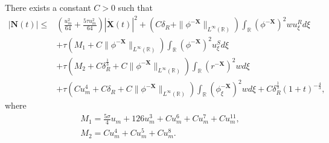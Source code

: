\documentclass[10pt,a4paper]{amsart}
\begin{document}
	\begin{lemma}\label{lem6}
		There exists a constant $C>0$ such that
		\begin{align*}
			\left|\mathbf{N}(t)\right|\leq&\left(\frac{u_m^2}{64}+\frac{5\tau u_m^2}{64}\right)|\dot{\mathbf{X}}(t)|^2+\left(C\delta_R+\|\phi^{-\mathbf{X}}\|_{L^{\infty}(\mathbb{R})}\right)\int_{\mathbb{R}}(\phi^{-\mathbf{X}})^2wu_{\xi}^Rd\xi\\
			&+\tau\left(M_1+C\|\phi^{-\mathbf{X}}\|_{L^{\infty}(\mathbb{R})}\right)\int_{\mathbb{R}}(\phi^{-\mathbf{X}})^2u_{\xi}^Sd\xi\\
			&+\tau\left(M_2+C\delta_R^{\frac{1}{3}}+C\|\phi^{-\mathbf{X}}\|_{L^{\infty}(\mathbb{R})}\right)\int_{\mathbb{R}}(r^{-\mathbf{X}})^2wd\xi\\
			&+\tau\left(Cu_m^4+C\delta_R+C\|\phi^{-\mathbf{X}}\|_{L^{\infty}(\mathbb{R})}\right)\int_{\mathbb{R}}(\phi_{\xi}^{-\mathbf{X}})^2wd\xi+C\delta_R^{\frac{1}{3}}(1+t)^{-\frac{4}{3}},
		\end{align*}
		where 
		\begin{align*}
			&M_1=\frac{5\sigma}{4}u_m+126u_m^3+C u_m^6+C u_m^7+Cu_m^{11},\\
			&M_2=Cu_m^4+C u_m^5+Cu_m^8.
		\end{align*}
	\end{lemma}
\end{document}
